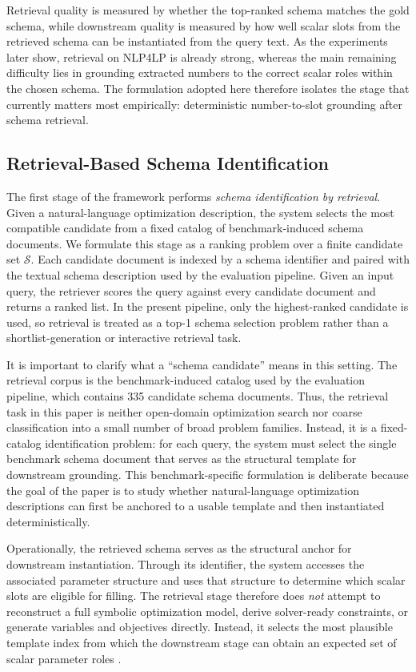 \documentclass[pdflatex,sn-basic,Numbered]{sn-jnl}
\begin{document}
Retrieval quality is measured by whether the top-ranked schema matches the gold schema, while downstream quality is measured by how well scalar slots from the retrieved schema can be instantiated from the query text. As the experiments later show, retrieval on \textsc{NLP4LP} is already strong, whereas the main remaining difficulty lies in grounding extracted numbers to the correct scalar roles within the chosen schema. The formulation adopted here therefore isolates the stage that currently matters most empirically: deterministic number-to-slot grounding after schema retrieval.

\subsection{Retrieval-Based Schema Identification}
\label{subsec:method_retrieval}

The first stage of the framework performs \emph{schema identification by retrieval}. Given a natural-language optimization description, the system selects the most compatible candidate from a fixed catalog of benchmark-induced schema documents. We formulate this stage as a ranking problem over a finite candidate set $\mathcal{S}$. Each candidate document is indexed by a schema identifier and paired with the textual schema description used by the evaluation pipeline. Given an input query, the retriever scores the query against every candidate document and returns a ranked list. In the present pipeline, only the highest-ranked candidate is used, so retrieval is treated as a top-1 schema selection problem rather than a shortlist-generation or interactive retrieval task.

It is important to clarify what a ``schema candidate'' means in this setting. The retrieval corpus is the benchmark-induced catalog used by the evaluation pipeline, which contains 335 candidate schema documents. Thus, the retrieval task in this paper is neither open-domain optimization search nor coarse classification into a small number of broad problem families. Instead, it is a fixed-catalog identification problem: for each query, the system must select the single benchmark schema document that serves as the structural template for downstream grounding. This benchmark-specific formulation is deliberate because the goal of the paper is to study whether natural-language optimization descriptions can first be anchored to a usable template and then instantiated deterministically.

Operationally, the retrieved schema serves as the structural anchor for downstream instantiation. Through its identifier, the system accesses the associated parameter structure and uses that structure to determine which scalar slots are eligible for filling. The retrieval stage therefore does \emph{not} attempt to reconstruct a full symbolic optimization model, derive solver-ready constraints, or generate variables and objectives directly. Instead, it selects the most plausible template index from which the downstream stage can obtain an expected set of scalar parameter roles \cite{nlp4lp_dataset,ramamonjison2023nl4opt,ahmaditeshnizi2024optimus_icml}.
\end{document}
